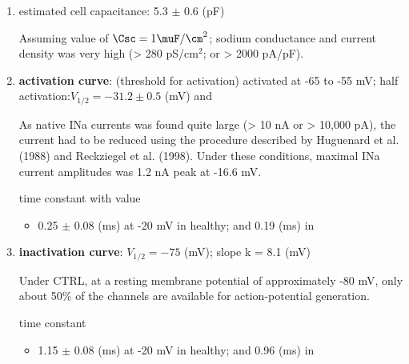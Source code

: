 \begin{enumerate}
  
  \item estimated cell capacitance: 5.3 $\pm$ 0.6 (pF)
  
  Assuming value of $\Csc = 1 \muF/\cm^2$; sodium conductance and current
  density was very high (> 280 pS/cm$^2$; or > 2000 pA/pF).
  
  \item {\bf activation curve}:  (threshold for activation) activated at -65 to
  -55 mV; %
  half activation:$V_{1/2} = -31.2 \pm 0.5$ (mV) and 

  As native INa currents was found quite large (> 10 nA or > 10,000 pA), the
  current had to be reduced using the procedure described by Huguenard et al.
  (1988) and Reckziegel et al. (1998). Under these conditions, maximal
  INa current amplitudes was 1.2 nA peak at -16.6 mV. 

   
   time constant with value
   \begin{itemize}
     \item 0.25 $\pm$ 0.08 (ms) at -20 mV in healthy; and 0.19 (ms) in \dtsz 
   \end{itemize}  
%   
%   
   \item {\bf inactivation curve}: $V_{1/2} = -75$ (mV); slope k = 8.1 (mV)
	
	Under CTRL, at a resting membrane potential of approximately -80 mV, only
	about 50\%  of the channels are available for action-potential generation. 
	
   time constant
   \begin{itemize}
     \item 1.15 $\pm$ 0.08 (ms) at -20 mV in healthy; and 0.96 (ms) in \dtsz
     
     
   \end{itemize}
  
\end{enumerate}




